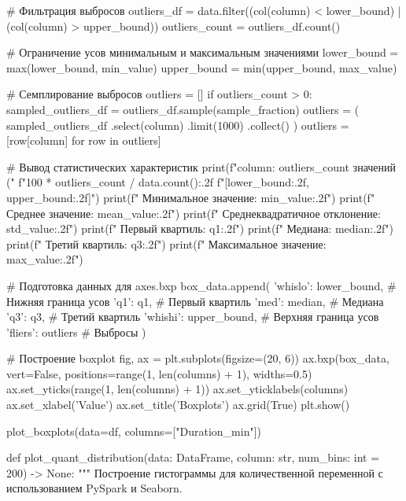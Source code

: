 \begin{code}
        # Фильтрация выбросов
        outliers_df = data.filter((col(column) < lower_bound) | (col(column) > upper_bound))
        outliers_count = outliers_df.count()

        # Ограничение усов минимальным и максимальным значениями
        lower_bound = max(lower_bound, min_value)
        upper_bound = min(upper_bound, max_value)

        # Семплирование выбросов
        outliers = []
        if outliers_count > 0:
            sampled_outliers_df = outliers_df.sample(sample_fraction)
            outliers = (
                sampled_outliers_df
                .select(column)
                .limit(1000)
                .collect()
            )
            outliers = [row[column] for row in outliers]

        # Вывод статистических характеристик
        print(f"{column}: {outliers_count} значений ("
              f"{100 * outliers_count / data.count():.2f}%
              f"[{lower_bound:.2f}, {upper_bound:.2f}]")
        print(f"  Минимальное значение:          {min_value:.2f}")
        print(f"  Среднее значение:              {mean_value:.2f}")
        print(f"  Среднеквадратичное отклонение: {std_value:.2f}")
        print(f"  Первый квартиль:               {q1:.2f}")
        print(f"  Медиана:                       {median:.2f}")
        print(f"  Третий квартиль:               {q3:.2f}")
        print(f"  Максимальное значение:         {max_value:.2f}")

        # Подготовка данных для axes.bxp
        box_data.append({
            'whislo': lower_bound,  # Нижняя граница усов
            'q1': q1,               # Первый квартиль
            'med': median,          # Медиана
            'q3': q3,               # Третий квартиль
            'whishi': upper_bound,  # Верхняя граница усов
            'fliers': outliers      # Выбросы
        })

    # Построение boxplot
    fig, ax = plt.subplots(figsize=(20, 6))
    ax.bxp(box_data,
           vert=False,
           positions=range(1, len(columns) + 1), widths=0.5)
    ax.set_yticks(range(1, len(columns) + 1))
    ax.set_yticklabels(columns)
    ax.set_xlabel('Value')
    ax.set_title('Boxplots')
    ax.grid(True)
    plt.show()

plot_boxplots(data=df, columns=["Duration_min"])

def plot_quant_distribution(data: DataFrame,
                            column: str,
                            num_bins: int = 200) -> None:
    """
    Построение гистограммы для количественной переменной с
    использованием PySpark и Seaborn.


\end{code}
